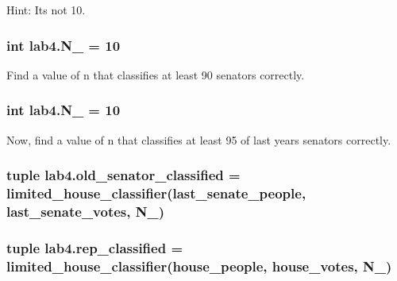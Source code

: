 Hint\+: It\textquotesingle{}s not 10. \hypertarget{namespacelab4_a35d81e5aba299c0a383ad648ed879fa8}{}
\subsubsection[{N\+\_\+2}]{\setlength{\rightskip}{0pt plus 5cm}int lab4.\+N\+\_ = 10}\label{namespacelab4_a35d81e5aba299c0a383ad648ed879fa8}


Find a value of n that classifies at least 90 senators correctly. 

\hypertarget{namespacelab4_af4fa52415c905938ba3e0b76e2b57196}{}
\subsubsection[{N\+\_\+3}]{\setlength{\rightskip}{0pt plus 5cm}int lab4.\+N\+\_ = 10}\label{namespacelab4_af4fa52415c905938ba3e0b76e2b57196}


Now, find a value of n that classifies at least 95 of last year\textquotesingle{}s senators correctly. 

\hypertarget{namespacelab4_a085a485c7a948fb548fb294216b560bc}{}
\subsubsection[{old\+\_\+senator\+\_\+classified}]{\setlength{\rightskip}{0pt plus 5cm}tuple lab4.\+old\+\_\+senator\+\_\+classified = {\bf limited\+\_\+house\+\_\+classifier}({\bf last\+\_\+senate\+\_\+people}, {\bf last\+\_\+senate\+\_\+votes}, {\bf N\+\_})}\label{namespacelab4_a085a485c7a948fb548fb294216b560bc}
\hypertarget{namespacelab4_a0a6d77c441ad0d92c2505978d09d00b6}{}
\subsubsection[{rep\+\_\+classified}]{\setlength{\rightskip}{0pt plus 5cm}tuple lab4.\+rep\+\_\+classified = {\bf limited\+\_\+house\+\_\+classifier}({\bf house\+\_\+people}, {\bf house\+\_\+votes}, {\bf N\+\_})}\label{namespacelab4_a0a6d77c441ad0d92c2505978d09d00b6}
\hypertarget{namespacelab4_ab431969dcbdc497ed29f78787174f64b}{}
